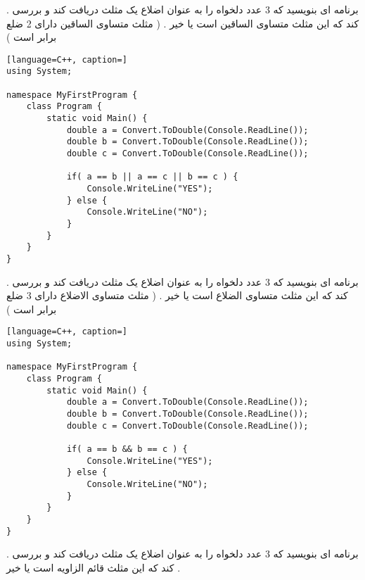 \documentclass[12pt]{article}
\begin{document}
\newpage

 . برنامه ای بنویسید که 3 عدد دلخواه را به عنوان اضلاع یک مثلث دریافت کند و بررسی کند که این مثلث متساوی الساقین است یا خیر . ( مثلث متساوی الساقین دارای 2 ضلع برابر است )





\begin{latin}
\begin{lstlisting}[language=C++, caption=]
using System;

namespace MyFirstProgram {
	class Program {
		static void Main() {
			double a = Convert.ToDouble(Console.ReadLine());
			double b = Convert.ToDouble(Console.ReadLine());
			double c = Convert.ToDouble(Console.ReadLine());

			if( a == b || a == c || b == c ) {
				Console.WriteLine("YES");
			} else {
				Console.WriteLine("NO");
			}
		}
	}
}
\end{lstlisting}
\end{latin}






\newpage

 . برنامه ای بنویسید که 3 عدد دلخواه را به عنوان اضلاع یک مثلث دریافت کند و بررسی کند که این مثلث متساوی الضلاع است یا خیر . ( مثلث متساوی الاضلاع دارای 3 ضلع برابر است )







\begin{latin}
\begin{lstlisting}[language=C++, caption=]
using System;

namespace MyFirstProgram {
	class Program {
		static void Main() {
			double a = Convert.ToDouble(Console.ReadLine());
			double b = Convert.ToDouble(Console.ReadLine());
			double c = Convert.ToDouble(Console.ReadLine());

			if( a == b && b == c ) {
				Console.WriteLine("YES");
			} else {
				Console.WriteLine("NO");
			}
		}
	}
}
\end{lstlisting}
\end{latin}





\newpage

 . برنامه ای بنویسید که 3 عدد دلخواه را به عنوان اضلاع یک مثلث دریافت کند و بررسی کند که این مثلث قائم الزاویه است یا خیر . 
\end{document}
